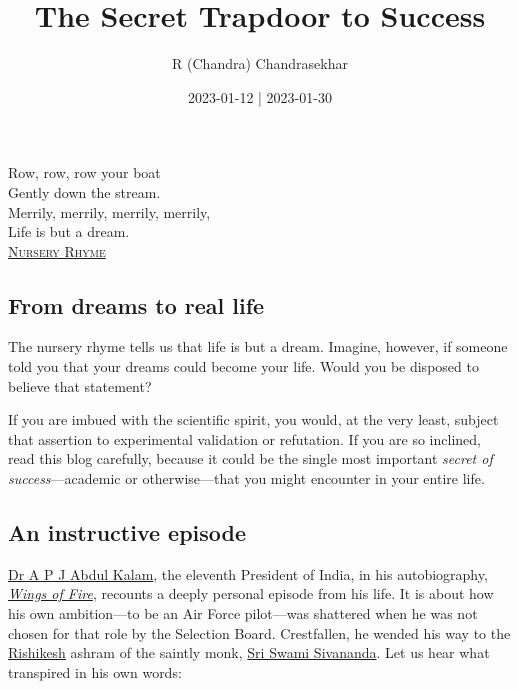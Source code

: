 \documentclass[
  a4paper,
]{article}
\title{The Secret Trapdoor to Success}
\author{R (Chandra) Chandrasekhar}
\date{2023-01-12 | 2023-01-30}
\begin{document}
\maketitle

\thispagestyle{empty}


\begin{flushright}

\begin{footnotesize}

Row, row, row your boat\\
Gently down the stream.\\
Merrily, merrily, merrily, merrily,\\
Life is but a dream.\\
\href{https://en.wikipedia.org/wiki/Row,_Row,_Row_Your_Boat}{\textsc{Nursery
Rhyme}}

\end{footnotesize}

\end{flushright}

\subsection{From dreams to real life}\label{from-dreams-to-real-life}

The nursery rhyme tells us that life is but a dream. Imagine, however,
if someone told you that your dreams could become your life. Would you
be disposed to believe that statement?

If you are imbued with the scientific spirit, you would, at the very
least, subject that assertion to experimental validation or refutation.
If you are so inclined, read this blog carefully, because it could be
the single most important \emph{secret of success}---academic or
otherwise---that you might encounter in your entire life.

\subsection{An instructive episode}\label{an-instructive-episode}

\href{https://en.wikipedia.org/wiki/A._P._J._Abdul_Kalam}{Dr A P J Abdul
Kalam}, the eleventh President of India, in his autobiography,
\href{https://en.wikipedia.org/wiki/Wings_of_Fire_(autobiography)}{\emph{Wings
of Fire}}, recounts a deeply personal episode from his life. It is about
how his own ambition---to be an Air Force pilot---was shattered when he
was not chosen for that role by the Selection Board. Crestfallen, he
wended his way to the
\href{https://en.wikipedia.org/wiki/Rishikesh}{Rishikesh} ashram of the
saintly monk,
\href{https://en.wikipedia.org/wiki/Sivananda_Saraswati}{Sri Swami
Sivananda}. Let us hear what transpired in his own words:
\end{document}
